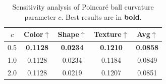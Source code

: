 \begin{table}[t]
\centering
\caption{Sensitivity analysis of Poincar\'{e} ball curvature parameter $c$. Best results are in \textbf{bold}.}
\label{tab:curvature}
\begin{tabular}{c|ccc|c}
\toprule
$c$ & Color$\uparrow$ & Shape$\uparrow$ & Texture$\uparrow$ & Avg$\uparrow$ \\
\midrule
0.5 & \textbf{0.1128} & \textbf{0.0234} & \textbf{0.1210} & \textbf{0.0858} \\
1.0 & 0.1128 & 0.0234 & 0.1184 & 0.0849 \\
2.0 & 0.1128 & 0.0219 & 0.1207 & 0.0851 \\
\bottomrule
\end{tabular}
\end{table}